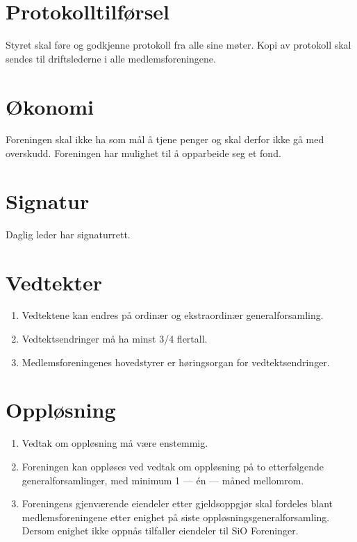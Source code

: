 \documentclass[11pt,norsk,a4paper]{article}
\begin{document}
\section{Protokolltilførsel}
Styret skal føre og godkjenne protokoll fra alle sine møter.
Kopi av protokoll skal sendes til driftslederne i alle medlemsforeningene.


\section{Økonomi}
Foreningen skal ikke ha som mål å tjene penger og skal derfor ikke gå med overskudd.
Foreningen har mulighet til å opparbeide seg et fond.


\section{Signatur}
Daglig leder har signaturrett.


\section{Vedtekter\label{sec:vedtekter}}
\begin{enumerate}
	\item Vedtektene kan endres på ordinær og ekstraordinær generalforsamling.
	\item Vedtektsendringer må ha minst 3/4 flertall. 
	\item Medlemsforeningenes hovedstyrer er høringsorgan
		for vedtektsendringer.
\end{enumerate}

\section{Oppløsning\label{sec:opplosing}}
\begin{enumerate}
	\item Vedtak om oppløsning må være enstemmig.
	\item Foreningen kan oppløses ved vedtak om oppløsning på to etterfølgende generalforsamlinger, med minimum 1 --- én --- måned mellomrom.
	\item Foreningens gjenværende eiendeler etter gjeldsoppgjør skal fordeles blant medlemsforeningene etter enighet på siste oppløsningsgeneralforsamling. Dersom enighet ikke oppnås tilfaller eiendeler til SiO Foreninger.
\end{enumerate}
\end{document}
